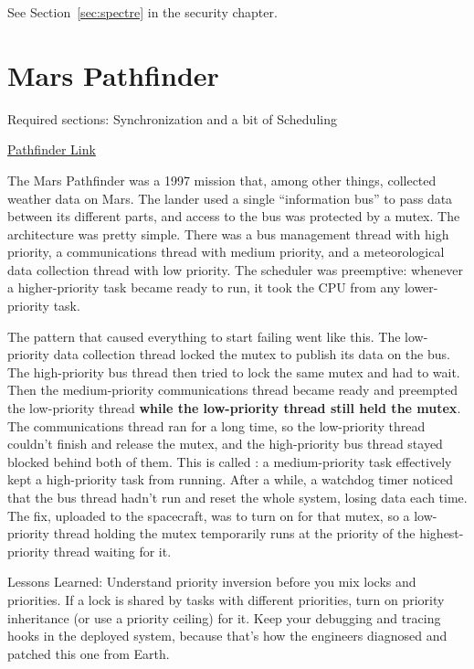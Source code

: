 See Section~\ref{sec:spectre} in the security chapter.

\section{Mars Pathfinder}
\label{pm:pathfinder}

Required sections: Synchronization and a bit of Scheduling

\href{https://www.microsoft.com/en-us/research/people/mbj/#!just-for-fun}{Pathfinder Link}

The Mars Pathfinder was a 1997 mission that, among other things, collected weather data on Mars.
The lander used a single ``information bus'' to pass data between its different parts, and access to the bus was protected by a mutex.
The architecture was pretty simple.
There was a bus management thread with high priority, a communications thread with medium priority, and a meteorological data collection thread with low priority.
The scheduler was preemptive: whenever a higher-priority task became ready to run, it took the CPU from any lower-priority task.

The pattern that caused everything to start failing went like this.
The low-priority data collection thread locked the mutex to publish its data on the bus.
The high-priority bus thread then tried to lock the same mutex and had to wait.
Then the medium-priority communications thread became ready and preempted the low-priority thread \textbf{while the low-priority thread still held the mutex}.
The communications thread ran for a long time, so the low-priority thread couldn't finish and release the mutex, and the high-priority bus thread stayed blocked behind both of them.
This is called : a medium-priority task effectively kept a high-priority task from running.
After a while, a watchdog timer noticed that the bus thread hadn't run and reset the whole system, losing data each time.
The fix, uploaded to the spacecraft, was to turn on  for that mutex, so a low-priority thread holding the mutex temporarily runs at the priority of the highest-priority thread waiting for it.

Lessons Learned: Understand priority inversion before you mix locks and priorities.
If a lock is shared by tasks with different priorities, turn on priority inheritance (or use a priority ceiling) for it.
Keep your debugging and tracing hooks in the deployed system, because that's how the engineers diagnosed and patched this one from Earth.

